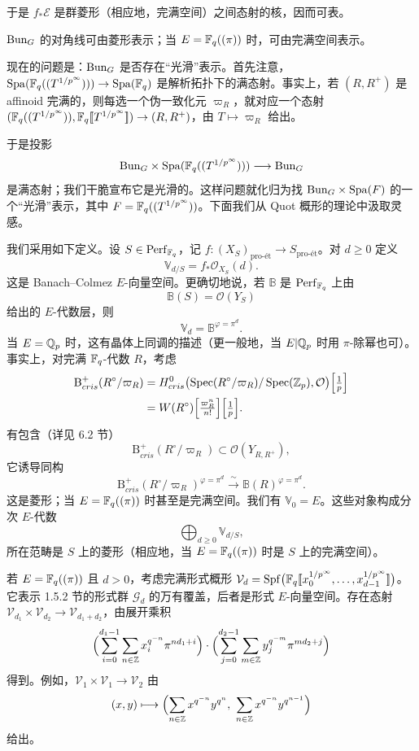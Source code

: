 
于是 $f_*\mathcal{E}$ 是群菱形（相应地，完满空间）之间态射的核，因而可表。

\begin{corollary}\label{cor:2.6}
$\mathrm{Bun}_G$ 的对角线可由菱形表示；当 $E=\mathbb{F}_q((\pi))$ 时，可由完满空间表示。
\end{corollary}

现在的问题是：$\mathrm{Bun}_G$ 是否存在“光滑”表示。首先注意，$\mathrm{Spa}(\mathbb{F}_q((T^{1/p^\infty})))\to \mathrm{Spa}(\mathbb{F}_q)$ 是解析拓扑下的满态射。事实上，若 $(R,R^+)$ 是 affinoid 完满的，则每选一个伪一致化元 $\varpi_R$，就对应一个态射 $(\mathbb{F}_q((T^{1/p^\infty})),\mathbb{F}_q[\![T^{1/p^\infty}]\!])\to(R,R^+)$，由 $T\mapsto\varpi_R$ 给出。

于是投影
\[
\mathrm{Bun}_G\times\mathrm{Spa}(\mathbb{F}_q((T^{1/p^\infty})))\longrightarrow\mathrm{Bun}_G
\]
是满态射；我们干脆宣布它是光滑的。这样问题就化归为找 $\mathrm{Bun}_G\times\mathrm{Spa}(F)$ 的一个“光滑”表示，其中 $F=\mathbb{F}_q((T^{1/p^\infty}))$。下面我们从 Quot 概形的理论中汲取灵感。

我们采用如下定义。设 $S\in \mathrm{Perf}_{\mathbb{F}_q}$，记 $f:(X_S)_{\text{pro-ét}}\to S_{\text{pro-ét}}$。对 $d\ge0$ 定义
\[
\mathbb{V}_{d/S}=f_*\mathcal{O}_{X_S}(d).
\]
这是 Banach–Colmez $E$-向量空间。更确切地说，若 $\mathbb{B}$ 是 $\mathrm{Perf}_{\mathbb{F}_q}$ 上由
\[
\mathbb{B}(S)=\mathcal{O}(Y_S)
\]
给出的 $E$-代数层，则
\[
\mathbb{V}_d=\mathbb{B}^{\varphi=\pi^d}.
\]
当 $E=\mathbb{Q}_p$ 时，这有晶体上同调的描述（更一般地，当 $E|\mathbb{Q}_p$ 时用 $\pi$-除幂也可）。事实上，对完满 $\mathbb{F}_q$-代数 $R$，考虑
\[
\begin{aligned}
\mathrm{B}^+_{cris}(R^\circ/\varpi_R)
&=H^0_{cris}\bigl(\operatorname{Spec}(R^\circ/\varpi_R)/\operatorname{Spec}(\mathbb{Z}_p),\mathcal{O}\bigr)\Bigl[\tfrac1p\Bigr]\\
&=W(R^\circ)\Bigl[\tfrac{\varpi_R^n}{n!}\Bigr]\Bigl[\tfrac1p\Bigr].
\end{aligned}
\]
有包含（详见 6.2 节）
\[
\mathrm{B}^+_{cris}(R^\circ/\varpi_R)\subset \mathcal{O}(Y_{R,R^+}),
\]
它诱导同构
\[
\mathrm{B}^+_{cris}(R^\circ/\varpi_R)^{\varphi=\pi^d}\xrightarrow{\ \sim\ }\mathbb{B}(R)^{\varphi=\pi^d}.
\]
这是菱形；当 $E=\mathbb{F}_q((\pi))$ 时甚至是完满空间。我们有 $\mathbb{V}_0=E$。这些对象构成分次 $E$-代数
\[
\bigoplus_{d\ge0}\mathbb{V}_{d/S},
\]
所在范畴是 $S$ 上的菱形（相应地，当 $E=\mathbb{F}_q((\pi))$ 时是 $S$ 上的完满空间）。

\begin{example}\label{ex:2.7}
若 $E=\mathbb{F}_q((\pi))$ 且 $d>0$，考虑完满形式概形 $\mathcal{V}_d=\operatorname{Spf}\bigl(\mathbb{F}_q[\![x_0^{1/p^\infty},\dots,x_{d-1}^{1/p^\infty}]\!]\bigr)$。它表示 1.5.2 节的形式群 $\mathcal{G}_d$ 的万有覆盖，后者是形式 $E$-向量空间。存在态射 $\mathcal{V}_{d_1}\times\mathcal{V}_{d_2}\to\mathcal{V}_{d_1+d_2}$，由展开乘积
\[
\Bigl(\sum_{i=0}^{d_1-1}\sum_{n\in\mathbb{Z}}x_i^{q^{-n}}\pi^{nd_1+i}\Bigr)\cdot\Bigl(\sum_{j=0}^{d_2-1}\sum_{m\in\mathbb{Z}}y_j^{q^{-m}}\pi^{md_2+j}\Bigr)
\]
得到。例如，$\mathcal{V}_1\times\mathcal{V}_1\to\mathcal{V}_2$ 由
\[
(x,y)\longmapsto\Bigl(\sum_{n\in\ZZ}x^{q^{-n}}y^{q^n},\ \sum_{n\in\ZZ}x^{q^{-n}}y^{q^{n-1}}\Bigr)
\]
给出。
\end{example}

